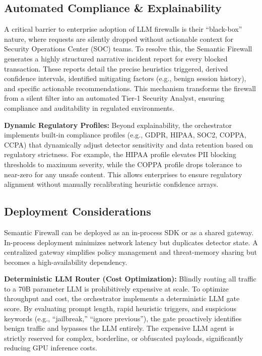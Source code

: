 \documentclass[conference]{IEEEtran}
\begin{document}
\subsection{Automated Compliance \& Explainability}
A critical barrier to enterprise adoption of LLM firewalls is their ``black-box'' nature, where requests are silently dropped without actionable context for Security Operations Center (SOC) teams. To resolve this, the Semantic Firewall generates a highly structured narrative incident report for every blocked transaction. These reports detail the precise heuristics triggered, derived confidence intervals, identified mitigating factors (e.g., benign session history), and specific actionable recommendations. This mechanism transforms the firewall from a silent filter into an automated Tier-1 Security Analyst, ensuring compliance and auditability in regulated environments.

\textbf{Dynamic Regulatory Profiles:} Beyond explainability, the orchestrator implements built-in compliance profiles (e.g., GDPR, HIPAA, SOC2, COPPA, CCPA) that dynamically adjust detector sensitivity and data retention based on regulatory strictness. For example, the HIPAA profile elevates PII blocking thresholds to maximum severity, while the COPPA profile drops tolerance to near-zero for any unsafe content. This allows enterprises to ensure regulatory alignment without manually recalibrating heuristic confidence arrays.

\subsection{Deployment Considerations}
Semantic Firewall can be deployed as an in-process SDK or as a shared gateway. In-process deployment minimizes network latency but duplicates detector state. A centralized gateway simplifies policy management and threat-memory sharing but becomes a high-availability dependency.

\textbf{Deterministic LLM Router (Cost Optimization):} Blindly routing all traffic to a 70B parameter LLM is prohibitively expensive at scale. To optimize throughput and cost, the orchestrator implements a deterministic LLM gate score. By evaluating prompt length, rapid heuristic triggers, and suspicious keywords (e.g., ``jailbreak,'' ``ignore previous''), the gate proactively identifies benign traffic and bypasses the LLM entirely. The expensive LLM agent is strictly reserved for complex, borderline, or obfuscated payloads, significantly reducing GPU inference costs.
\end{document}
